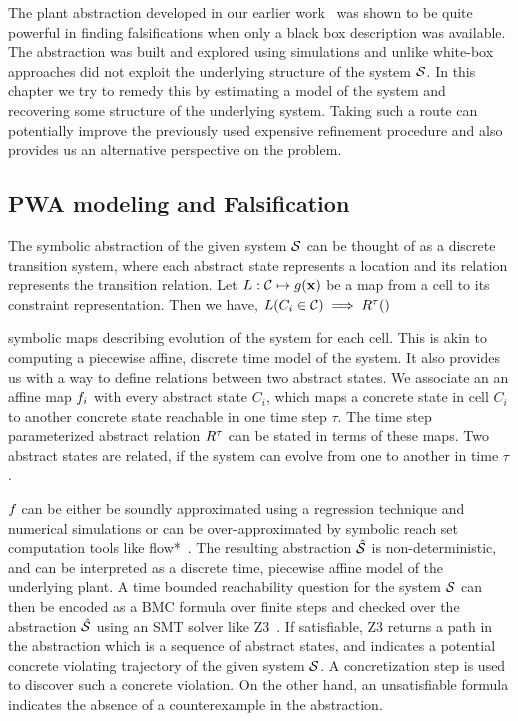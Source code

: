 The plant abstraction developed in our earlier
work~\cite{zutshi2014multiple} was shown to be quite powerful in
finding falsifications when only a black box description was
available. The abstraction was built and explored using simulations
and unlike white-box approaches did not exploit the underlying
structure of the system $\mathcal{S}$. In this chapter we try to remedy this
by estimating a model of the system and recovering some structure of
the underlying system. Taking such a route can potentially improve the
previously used expensive refinement procedure and also provides us an
alternative perspective on the problem.

\subsection{PWA modeling and Falsification}

The symbolic abstraction of the given system $\mathcal{S}$ can be thought of
as a discrete transition system, where each abstract state represents
a location and its relation represents the transition relation. Let
$L: \mathcal{C} \mapsto g(\mathbf{x})$ be a map from a cell to its constraint
representation. Then we have, $L(C_i\in\mathcal{C}) \implies R^{\tau}()$


symbolic maps describing evolution of the system for each cell. This
is akin to computing a piecewise affine, discrete time model of the
system. It also provides us with a way to define relations between two
abstract states. We associate an an affine map $f_{i}$ with every
abstract state $C_i$, which maps a concrete state in cell $C_i$ to
another concrete state reachable in one time step $\tau$. The time
step parameterized abstract relation $R^{\tau}$ can be stated in
terms of these maps. Two abstract states are related, if the system
can evolve from one to another in time $\tau$.

$f_{}$ can be either be soundly approximated using a regression
technique and numerical simulations or can be over-approximated by
symbolic reach set computation tools like flow*~\cite{chen2013flow}.
The resulting abstraction $\hat{\mathcal{S}}$ is non-deterministic, and can
be interpreted as a discrete time, piecewise affine model of the
underlying plant. A time bounded reachability question for the system
$\mathcal{S}$ can then be encoded as a BMC formula over finite steps and
checked over the abstraction $\hat{\mathcal{S}}$ using an SMT solver like
Z3~\cite{DeMoura+Bjorner/08/Z3}. If satisfiable, Z3 returns a path in
the abstraction which is a sequence of abstract states, and indicates
a potential concrete violating trajectory of the given system $\mathcal{S}$.
A concretization step is used to discover such a concrete violation.
On the other hand, an unsatisfiable formula indicates the absence of a
counterexample in the abstraction.

